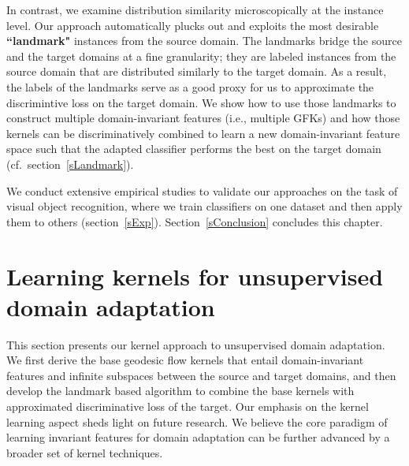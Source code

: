In contrast, we examine distribution similarity microscopically at the instance level.  Our approach automatically plucks out and exploits the most desirable {\bf ``landmark"} instances from the source domain. The landmarks bridge the source and the target domains at a fine granularity; they are labeled instances from the source domain that are distributed similarly to the target domain. As a result, the labels of the landmarks serve as a good proxy for us to approximate the discrimintive loss on the target domain. We show how to use those landmarks to construct multiple domain-invariant features (i.e., multiple GFKs) and how those kernels can be discriminatively combined to learn a new domain-invariant feature space such that the adapted classifier performs the best on the target domain  (cf.\ section~\ref{sLandmark}).


We conduct extensive empirical studies to validate our approaches on the task of visual object recognition, where we train classifiers on one dataset and then apply them to others (section~\ref{sExp}). Section~\ref{sConclusion} concludes this chapter. 


\section{Learning kernels for unsupervised domain adaptation}
This section presents our kernel approach to unsupervised domain adaptation. We first derive the base geodesic flow kernels that entail domain-invariant features and infinite subspaces between the source and target domains, and then develop the landmark based algorithm to combine the base kernels with approximated discriminative loss of the target. Our emphasis on the kernel learning aspect sheds light on future research. We believe the core paradigm of learning invariant features for domain adaptation can be further advanced by a broader set of kernel  techniques. 


